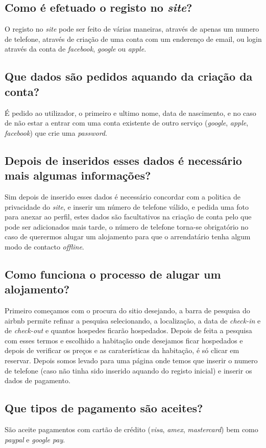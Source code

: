 \documentclass[a4paper]{article}
\begin{document}
\subsection{Como é efetuado o registo no \textit{site}?}
O registo no \textit{site} pode ser feito de várias maneiras, através de apenas um numero de telefone, através de criação de uma conta com um enderenço de email, ou login através da conta de \textit{facebook}, \textit{google} ou \textit{apple}.

\subsection{Que dados são pedidos aquando da criação da conta?}
É pedido ao utilizador, o primeiro e ultimo nome, data de nascimento, e no caso de não estar a entrar com uma conta existente de outro serviço (\textit{google}, \textit{apple}, \textit{facebook}) que crie uma \textit{password}.

\subsection{Depois de inseridos esses dados é necessário mais algumas informações?}
Sim depois de inserido esses dados é necessário concordar com a politica de privacidade do \textit{site}, e inserir um número de telefone válido, e pedida uma foto para anexar ao perfil, estes dados são facultativos na criação de conta pelo que pode ser adicionados mais tarde, o número de telefone torna-se obrigatório no caso de querermos alugar um alojamento para que o arrendatário tenha algum modo de contacto \textit{offline}.

\subsection{Como funciona o processo de alugar um alojamento?}
Primeiro começamos com o procura do sitio desejando, a barra de pesquisa do airbnb permite refinar a pesquisa selecionando, a localização, a data de \textit{check-in} e de \textit{check-out} e quantos hospedes ficarão hospedados.
Depois de feita a pesquisa com esses termos e escolhido a habitação onde desejamos ficar hospedados e depois de verificar os preços e as caraterísticas da habitação, é só clicar em reservar.
Depois somos levado para uma página onde temos que inserir o numero de telefone (caso não tinha sido inserido aquando do registo inicial) e inserir os dados de pagamento.

\subsection{Que tipos de pagamento são aceites?}
São aceite pagamentos com cartão de crédito (\textit{visa}, \textit{amex}, \textit{mastercard}) bem como \textit{paypal} e \textit{google pay}.
\end{document}

